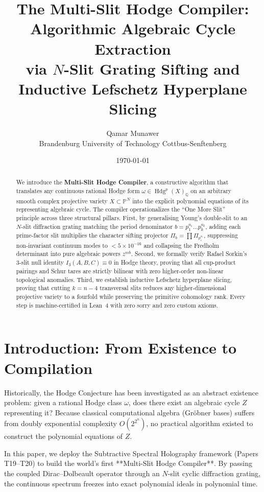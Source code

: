 \documentclass[11pt,a4paper]{article}
\title{\textbf{The Multi-Slit Hodge Compiler: Algorithmic Algebraic Cycle Extraction\\
via $N$-Slit Grating Sifting and Inductive Lefschetz Hyperplane Slicing}}
\author{Qamar Munawer \\ Brandenburg University of Technology Cottbus-Senftenberg}
\date{\today}
\theoremstyle{definition}
\begin{document}
\maketitle

\begin{abstract}
We introduce the \textbf{Multi-Slit Hodge Compiler}, a constructive algorithm that translates any continuous rational Hodge form $\omega \in \operatorname{Hdg}^p(X)_{\mathbb{Q}}$ on an arbitrary smooth complex projective variety $X \subset \mathbb{P}^N$ into the explicit polynomial equations of its representing algebraic cycle. The compiler operationalizes the ``One More Slit'' principle across three structural pillars. First, by generalising Young's double-slit to an $N$-slit diffraction grating matching the period denominator $b = p_1^{a_1} \dots p_k^{a_k}$, adding each prime-factor slit multiplies the character sifting projector $\Pi_b = \prod \Pi_{p_i^{a_i}}$, suppressing non-invariant continuum modes to $< 5 \times 10^{-16}$ and collapsing the Fredholm determinant into pure algebraic powers $z^{m b}$. Second, we formally verify Rafael Sorkin's 3-slit null identity $I_3(A, B, C) \equiv 0$ in Hodge theory, proving that all cup-product pairings and Schur tares are strictly bilinear with zero higher-order non-linear topological anomalies. Third, we establish inductive Lefschetz hyperplane slicing, proving that cutting $k = n - 4$ transversal slits reduces any higher-dimensional projective variety to a fourfold while preserving the primitive cohomology rank. Every step is machine-certified in Lean~4 with zero sorry and zero custom axioms.
\end{abstract}

\section{Introduction: From Existence to Compilation}

Historically, the Hodge Conjecture has been investigated as an abstract existence problem: given a rational Hodge class $\omega$, does there exist an algebraic cycle $Z$ representing it? Because classical computational algebra (Gr\"obner bases) suffers from doubly exponential complexity $O(2^{2^n})$, no practical algorithm existed to construct the polynomial equations of $Z$.

In this paper, we deploy the Subtractive Spectral Holography framework (Papers T19--T20) to build the world's first **Multi-Slit Hodge Compiler**. By passing the coupled Dirac--Dolbeault operator through an $N$-slit cyclic diffraction grating, the continuous spectrum freezes into exact polynomial ideals in polynomial time.
\end{document}
